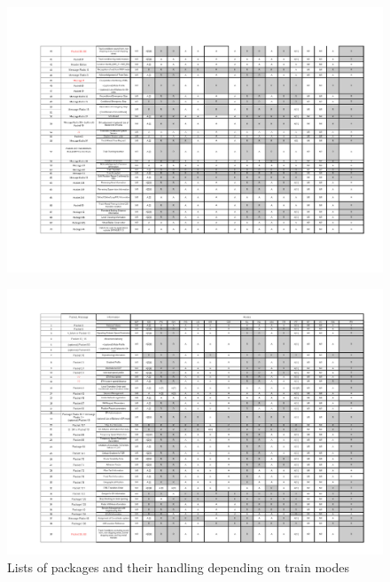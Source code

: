 \begin{figure}
\centering
\includegraphics [angle=90, scale=0.8]{images/FilterMode1}
\end{figure}
\begin{figure}
\centering
\includegraphics [angle=90, scale=0.8]{images/FilterMode2}
\caption{Lists of packages and their handling depending on train modes}
\label{fig:PackagesListMode}
\end{figure}


